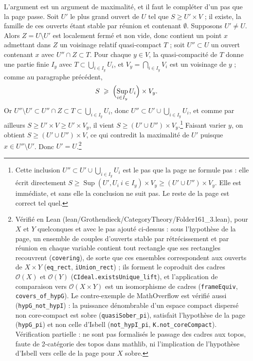 \documentclass[11pt,a4paper]{article}
\begin{document}
L'argument est un argument de maximalité, et il faut le compléter d'un pas que
la page passe. Soit $U'$ le plus grand ouvert de $U$ tel que
$S \geqslant U' \times V$ ; il existe, la famille de ces ouverts étant stable
par réunion et contenant $\emptyset$. Supposons $U' \neq U$. Alors
$Z = U \setminus U'$ est localement fermé et non vide, donc contient un point
$x$ admettant dans $Z$ un voisinage relatif quasi-compact $T$ ; soit
$U'' \subset U$ un ouvert contenant $x$ avec $U'' \cap Z \subset T$. Pour
chaque $y \in V$, la quasi-compacité de $T$ donne une partie finie $I_{y}$ avec
$T \subset \bigcup_{i \in I_{y}} U_{i}$, et $V_{y} = \bigcap_{i \in I_{y}} V_{i}$
est un voisinage de $y$ ; comme au paragraphe précédent,
\[
S \;\geqslant\; \Bigl(\operatorname*{Sup}_{i \in I_{y}} U_{i}\Bigr) \times V_{y}.
\]
Or $U'' \setminus U' \subset U'' \cap Z \subset T \subset
\bigcup_{i \in I_{y}} U_{i}$, donc $U'' \subset U' \cup
\bigcup_{i \in I_{y}} U_{i}$, et comme par ailleurs
$S \geqslant U' \times V \geqslant U' \times V_{y}$, il vient
$S \geqslant (U' \cup U'') \times V_{y}$.\footnote{Cette inclusion
$U'' \subset U' \cup \bigcup_{i \in I_{y}} U_{i}$ est le pas que la page ne
formule pas : elle écrit directement
$S \geqslant \operatorname{Sup}(U', U_{i}\ i \in I_{y}) \times V_{y}
\geqslant (U' \cup U'') \times V_{y}$. Elle est immédiate, et sans elle la
conclusion ne suit pas. Le reste de la page est correct tel quel.} Faisant
varier $y$, on obtient $S \geqslant (U' \cup U'') \times V$, ce qui contredit
la maximalité de $U'$ puisque $x \in U'' \setminus U'$. Donc $U' = U$.\footnote{Vérifié en Lean
(lean/Grothendieck/CategoryTheory/Folder161\_3.lean), pour $X$ et $Y$ quelconques et avec le
pas ajouté ci-dessus : sous l'hypothèse de la page, un ensemble de couples
d'ouverts stable par rétrécissement et par réunion en chaque variable contient
tout rectangle que ses rectangles recouvrent (\texttt{covering}), de sorte que
ces ensembles correspondent aux ouverts de $X \times Y$ (\texttt{eq\_rect},
\texttt{iUnion\_rect}) ; ils forment le coproduit des cadres $\mathcal{O}(X)$
et $\mathcal{O}(Y)$ (\texttt{CIdeal.existsUnique\_lift}), et l'application
de comparaison vers $\mathcal{O}(X \times Y)$ est un isomorphisme de cadres
(\texttt{frameEquiv}, \texttt{covers\_of\_hypG}). Le contre-exemple de
MathOverflow est vérifié aussi (\texttt{hypG\_not\_hypI}) : la puissance
dénombrable d'un espace compact dispersé non core-compact est sobre
(\texttt{quasiSober\_pi}), satisfait l'hypothèse de la page
(\texttt{hypG\_pi}) et non celle d'Isbell (\texttt{not\_hypI\_pi},
\texttt{K.not\_coreCompact}). Vérification partielle : ne sont pas formalisés
le passage des cadres aux topos, faute de 2-catégorie des topos dans mathlib,
ni l'implication de l'hypothèse d'Isbell vers celle de la page pour $X$
sobre.}
\end{document}
